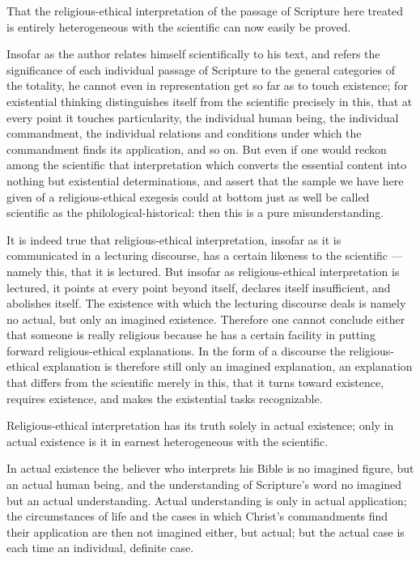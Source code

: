 \documentclass[12pt,a4paper]{book}
\begin{document}
That the religious-ethical interpretation of the passage of Scripture here treated is
entirely heterogeneous with the scientific can now easily be proved.

Insofar as the author relates himself scientifically to his text, and refers the
significance of each individual passage of Scripture to the general categories of the
totality, he cannot even in representation get so far as to touch existence; for
existential thinking distinguishes itself from the scientific precisely in this, that at
every point it touches particularity, the individual human being, the individual
commandment, the individual relations and conditions under which the commandment finds
its application, and so on. But even if one would reckon among the scientific that
interpretation which converts the essential content into nothing but existential
determinations, and assert that the sample we have here given of a religious-ethical
exegesis could at bottom just as well be called scientific as the
philological-historical: then this is a pure misunderstanding.

It is indeed true that religious-ethical interpretation, insofar as it is communicated
in a lecturing discourse, has a certain likeness to the scientific --- namely this, that
it is lectured. But insofar as religious-ethical interpretation is lectured, it points at
every point beyond itself, declares itself insufficient, and abolishes itself. The
existence with which the lecturing discourse deals is namely no actual, but only an
imagined existence. Therefore one cannot conclude either that someone is really religious
because he has a certain facility in putting forward religious-ethical explanations. In
the form of a discourse the religious-ethical explanation is therefore still only an
imagined explanation, an explanation that differs from the scientific merely in this,
that it turns toward existence, requires existence, and makes the existential tasks
recognizable.

Religious-ethical interpretation has its truth solely in actual existence; only in actual
existence is it in earnest heterogeneous with the scientific.

In actual existence the believer who interprets his Bible is no imagined figure, but an
actual human being, and the understanding of Scripture's word no imagined but an actual
understanding. Actual understanding is only in actual application; the circumstances of
life and the cases in which Christ's commandments find their
application are then not imagined either, but actual; but the actual case is each time an
individual, definite case.
\end{document}
